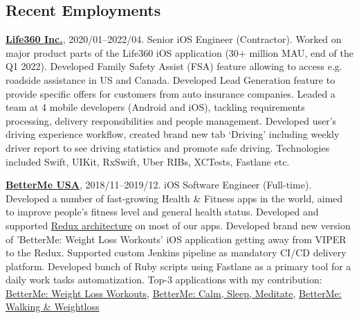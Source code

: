\documentclass{nk-resume}
\begin{document}

\subsection*{Recent Employments}

\textbf{\href{https://www.life360.com}{Life360 Inc.}}, 2020/01--2022/04. 
Senior iOS Engineer (Contractor).\newline
Worked on major product parts of the Life360 iOS application 
(30+ million MAU, end of the Q1 2022). Developed Family Safety Assist (FSA) feature allowing to access 
e.g. roadside assistance in US and Canada. Developed Lead Generation feature to provide specific offers 
for customers from auto insurance companies. Leaded a team at 4 mobile developers (Android and iOS), 
tackling requirements processing, delivery responsibilities and people management. Developed user's 
driving experience workflow, created brand new tab ‘Driving’ including weekly driver report 
to see driving statistics and promote safe driving.\newline
Technologies included Swift, UIKit, RxSwift, Uber RIBs, XCTests, Fastlane etc.

\vspace*{14px}

\textbf{\href{https://betterme.world/about}{BetterMe USA}}, 2018/11--2019/12. 
iOS Software Engineer (Full-time).
\newline Developed a number of fast-growing Health \& Fitness apps in the world, 
aimed to improve people’s fitness level and general health status. Developed and supported 
\href{https://www.raywenderlich.com/books/advanced-ios-app-architecture/v3.0/chapters/6-architecture-redux}{Redux architecture} 
on most of our apps. Developed brand new version of 'BetterMe: Weight Loss Workouts' iOS application 
getting away from VIPER to the Redux. Supported custom Jenkins pipeline as mandatory CI/CD delivery platform. 
Developed bunch of Ruby scripts using Fastlane as a primary tool for a daily work tasks automatization.
Top-3 applications with my contribution: 
\href{https://apps.apple.com/us/app/betterme-weight-loss-workouts/id1264546236}{BetterMe: Weight Loss Workouts}, 
\href{https://apps.apple.com/us/app/betterme-calm-sleep-meditate/id1363010081}{BetterMe: Calm, Sleep, Meditate}, 
\href{https://apps.apple.com/us/app/betterme-walking-weightloss/id1434400695}{BetterMe: Walking \& Weightloss}

\vspace*{14px}
\end{document}
